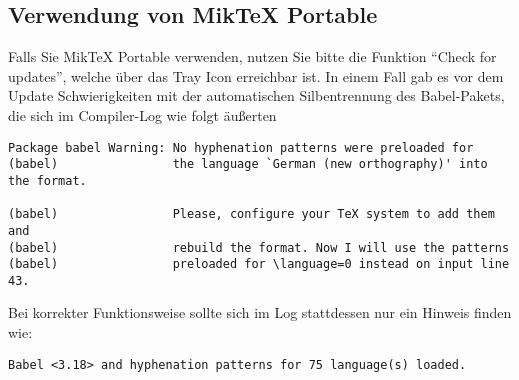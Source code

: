 \subsection{Verwendung von MikTeX Portable}
Falls Sie MikTeX Portable verwenden, nutzen Sie bitte die Funktion \enquote{Check for updates}, welche über das Tray Icon erreichbar ist. In einem Fall gab es vor dem Update Schwierigkeiten mit der automatischen Silbentrennung des Babel-Pakets, die sich im Compiler-Log wie folgt äußerten
{\small\begin{verbatim}
Package babel Warning: No hyphenation patterns were preloaded for
(babel)                the language `German (new orthography)' into the format.

(babel)                Please, configure your TeX system to add them and
(babel)                rebuild the format. Now I will use the patterns
(babel)                preloaded for \language=0 instead on input line 43.
\end{verbatim}
}
Bei korrekter Funktionsweise sollte sich im Log stattdessen nur ein Hinweis finden wie:
{\small\begin{verbatim}
Babel <3.18> and hyphenation patterns for 75 language(s) loaded.
\end{verbatim}
}